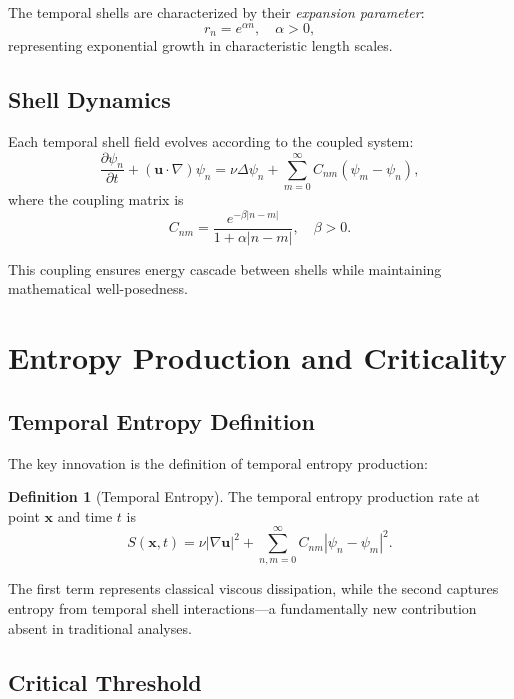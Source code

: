 \documentclass[11pt,a4paper]{article}
\theoremstyle{definition}
\newtheorem{definition}[theorem]{Definition}
\newcommand{\pd}[2]{\frac{\partial #1}{\partial #2}}
\newcommand{\grad}{\nabla}
\newcommand{\lapl}{\Delta}
\newcommand{\al}{\alpha}
\newcommand{\be}{\beta}
\begin{document}
The temporal shells are characterized by their \emph{expansion parameter}:
\begin{equation}
r_n = e^{\al n}, \quad \al > 0,
\end{equation}
representing exponential growth in characteristic length scales.

\subsection{Shell Dynamics}

Each temporal shell field evolves according to the coupled system:
\begin{equation}\label{eq:shell_evolution}
\pd{\psi_n}{t} + (\mathbf{u} \cdot \grad)\psi_n = \nu \lapl \psi_n + \sum_{m=0}^\infty C_{nm}(\psi_m - \psi_n),
\end{equation}
where the coupling matrix is
\begin{equation}
C_{nm} = \frac{e^{-\be|n-m|}}{1 + \al|n-m|}, \quad \be > 0.
\end{equation}

This coupling ensures energy cascade between shells while maintaining mathematical well-posedness.

\section{Entropy Production and Criticality}

\subsection{Temporal Entropy Definition}

The key innovation is the definition of temporal entropy production:

\begin{definition}[Temporal Entropy]
The temporal entropy production rate at point $\mathbf{x}$ and time $t$ is
\begin{equation}\label{eq:entropy}
S(\mathbf{x}, t) = \nu |\grad \mathbf{u}|^2 + \sum_{n,m=0}^\infty C_{nm}|\psi_n - \psi_m|^2.
\end{equation}
\end{definition}

The first term represents classical viscous dissipation, while the second captures entropy from temporal shell interactions---a fundamentally new contribution absent in traditional analyses.

\subsection{Critical Threshold}
\end{document}
